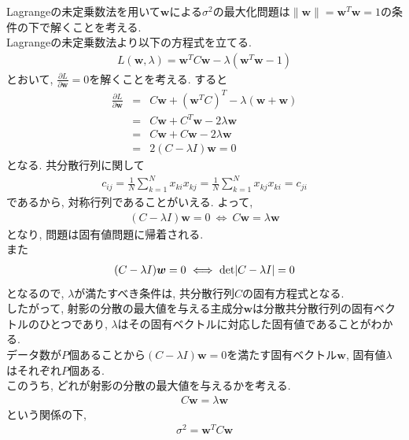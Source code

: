 \documentclass[dvipdfmx,a4j]{jsarticle}
\begin{document}
Lagrangeの未定乗数法を用いて$\bm{w}$による$\sigma^{2}$の最大化問題は$\|\bm{w}\|=\bm{w}^{T}\bm{w}=1$の条件の下で解くことを考える.\\
Lagrangeの未定乗数法より以下の方程式を立てる.
\begin{eqnarray*}
    L(\bm{w},\lambda)=\bm{w}^{T}C\bm{w}-\lambda(\bm{w}^{T}\bm{w}-1)
\end{eqnarray*}
とおいて, $\displaystyle \frac{\partial L}{\partial \bm{w}}=0$を解くことを考える. すると
\begin{eqnarray*}
    \frac{\partial L}{\partial \bm{w}}&=&C\bm{w}+(\bm{w}^{T}C)^{T}-\lambda(\bm{w}+\bm{w})\\
                                      &=&C\bm{w}+C^{T}\bm{w}-2\lambda \bm{w}\\
                                      &=&C\bm{w}+C\bm{w}-2\lambda \bm{w}\\
                                      &=&2(C-\lambda I)\bm{w} = 0
\end{eqnarray*}
となる. 共分散行列に関して
\begin{eqnarray*}
    c_{ij}=\frac{1}{N}\sum_{k=1}^{N}x_{ki}x_{kj} = \frac{1}{N}\sum_{k=1}^{N}x_{kj}x_{ki} = c_{ji}
\end{eqnarray*}
であるから, 対称行列であることがいえる. よって,
\begin{eqnarray*}
    (C-\lambda I)\bm{w} = 0 \ \Longleftrightarrow\ C\bm{w} = \lambda \bm{w}
\end{eqnarray*}
となり, 問題は固有値問題に帰着される.\\
また
\begin{eqnarray*}
    (C-\lambda I)\bm{w} = 0 \ \Longleftrightarrow\ {\rm det}|C-\lambda I|=0
\end{eqnarray*}
となるので, $\lambda$が満たすべき条件は, 共分散行列$C$の固有方程式となる.\\
したがって, 射影の分散の最大値を与える主成分$\bm{w}$は分散共分散行列の固有ベクトルのひとつであり, $\lambda$はその固有ベクトルに対応した固有値であることがわかる.\\
データ数が$P$個あることから$(C-\lambda I)\bm{w}=0$を満たす固有ベクトル$\bm{w}$, 固有値$\lambda$はそれぞれ$P$個ある.\\
このうち, どれが射影の分散の最大値を与えるかを考える.
\begin{eqnarray*}
    C\bm{w} = \lambda \bm{w}
\end{eqnarray*}
という関係の下,
\begin{eqnarray*}
    \sigma^{2}=\bm{w}^{T}C\bm{w}
\end{eqnarray*}
\end{document}
